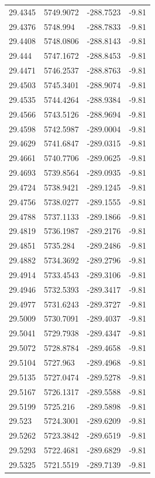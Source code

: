 \begin{table}[H]
\begin{tabular}{llll}
29.4345 & 5749.9072 & -288.7523 & -9.81 \\
29.4376 & 5748.994 & -288.7833 & -9.81 \\
29.4408 & 5748.0806 & -288.8143 & -9.81 \\
29.444 & 5747.1672 & -288.8453 & -9.81 \\
29.4471 & 5746.2537 & -288.8763 & -9.81 \\
29.4503 & 5745.3401 & -288.9074 & -9.81 \\
29.4535 & 5744.4264 & -288.9384 & -9.81 \\
29.4566 & 5743.5126 & -288.9694 & -9.81 \\
29.4598 & 5742.5987 & -289.0004 & -9.81 \\
29.4629 & 5741.6847 & -289.0315 & -9.81 \\
29.4661 & 5740.7706 & -289.0625 & -9.81 \\
29.4693 & 5739.8564 & -289.0935 & -9.81 \\
29.4724 & 5738.9421 & -289.1245 & -9.81 \\
29.4756 & 5738.0277 & -289.1555 & -9.81 \\
29.4788 & 5737.1133 & -289.1866 & -9.81 \\
29.4819 & 5736.1987 & -289.2176 & -9.81 \\
29.4851 & 5735.284 & -289.2486 & -9.81 \\
29.4882 & 5734.3692 & -289.2796 & -9.81 \\
29.4914 & 5733.4543 & -289.3106 & -9.81 \\
29.4946 & 5732.5393 & -289.3417 & -9.81 \\
29.4977 & 5731.6243 & -289.3727 & -9.81 \\
29.5009 & 5730.7091 & -289.4037 & -9.81 \\
29.5041 & 5729.7938 & -289.4347 & -9.81 \\
29.5072 & 5728.8784 & -289.4658 & -9.81 \\
29.5104 & 5727.963 & -289.4968 & -9.81 \\
29.5135 & 5727.0474 & -289.5278 & -9.81 \\
29.5167 & 5726.1317 & -289.5588 & -9.81 \\
29.5199 & 5725.216 & -289.5898 & -9.81 \\
29.523 & 5724.3001 & -289.6209 & -9.81 \\
29.5262 & 5723.3842 & -289.6519 & -9.81 \\
29.5293 & 5722.4681 & -289.6829 & -9.81 \\
29.5325 & 5721.5519 & -289.7139 & -9.81 \\

\end{tabular}
\end{table}
